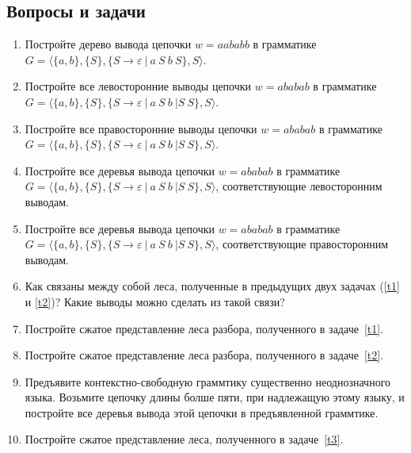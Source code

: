 \subsection{Вопросы и задачи}
\begin{enumerate}
  \item Постройте дерево вывода цепочки $w=aababb$ в грамматике $G=\langle\{a,b\},\{S\},\{S\rightarrow \varepsilon \ | \ a \ S \ b \ S \}, S \rangle$.
  \item Постройте все левосторонние выводы цепочки $w=ababab$ в грамматике $G=\langle\{a,b\},\{S\},\{S\rightarrow \varepsilon \ | \ a \ S \ b \ | S \ S\}, S \rangle$.
  \item Постройте все правосторонние выводы цепочки $w=ababab$ в грамматике $G=\langle\{a,b\},\{S\},\{S\rightarrow \varepsilon \ | \ a \ S \ b \ | S \ S\}, S \rangle$.
  \item \label{t1}Постройте все деревья вывода цепочки $w=ababab$ в грамматике $G=\langle\{a,b\},\{S\},\{S\rightarrow \varepsilon \ | \ a \ S \ b \ | S \ S\}, S \rangle$, соответствующие левосторонним выводам.
  \item \label{t2}Постройте все деревья вывода цепочки $w=ababab$ в грамматике $G=\langle\{a,b\},\{S\},\{S\rightarrow \varepsilon \ | \ a \ S \ b \ | S \ S\}, S \rangle$, соответствующие правосторонним выводам.
  \item Как связаны между собой леса, полученные в предыдущих двух задачах (\ref{t1} и \ref{t2})? Какие выводы можно сделать из такой связи?
  \item Постройте сжатое представление леса разбора, полученного в задаче~\ref{t1}.
  \item Постройте сжатое представление леса разбора, полученного в задаче~\ref{t2}.
  \item \label{t3}Предъявите контекстно-свободную граммтику существенно неоднозначного языка. 
        Возьмите цепочку длины болше пяти, при надлежащую этому языку, и постройте все деревья вывода этой цепочки в предъявленной граммтике. 
  \item Постройте сжатое представление леса, полученного в задаче~\ref{t3}.
\end{enumerate}
